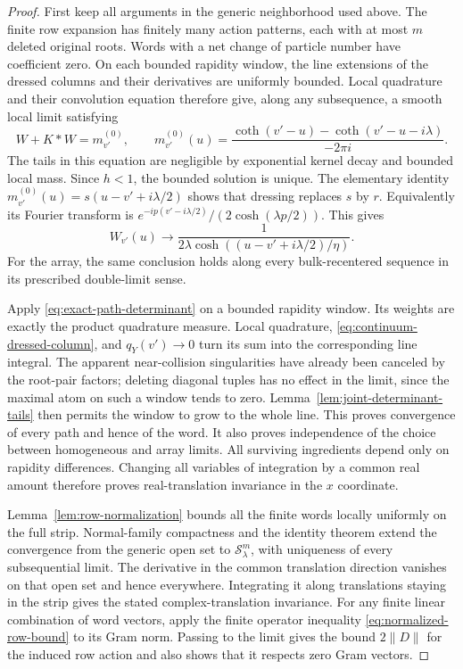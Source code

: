 \begin{proof}
First keep all arguments in the generic neighborhood used above.
The finite row expansion has finitely many action patterns, each
with at most $m$ deleted original roots.  Words with a net change
of particle number have coefficient zero.
On each bounded rapidity window, the line extensions of the
dressed columns and their derivatives are uniformly bounded.
Local quadrature and their convolution equation therefore give,
along any subsequence, a smooth local limit satisfying
\[
 W+K*W=m^{(0)}_{v'},
 \qquad
 m^{(0)}_{v'}(u)=
       \frac{\coth(v'-u)-\coth(v'-u-i\lambda)}{-2\pi i}.
\]
The tails in this equation are negligible by exponential kernel
decay and bounded local mass.  Since $h<1$, the bounded solution
is unique.  The elementary identity
$m^{(0)}_{v'}(u)=s(u-v'+i\lambda/2)$ shows that dressing
replaces $s$ by $r$.  Equivalently its Fourier transform is
$e^{-ip(v'-i\lambda/2)}/(2\cosh(\lambda p/2))$.
This gives
\begin{equation}\label{eq:continuum-dressed-column}
 W_{v'}(u)\longrightarrow
 \frac{1}{2\lambda
          \cosh((u-v'+i\lambda/2)/\eta)}.
\end{equation}
For the array, the same conclusion holds along every bulk-recentered
sequence in its prescribed double-limit sense.

Apply \eqref{eq:exact-path-determinant} on a bounded rapidity
window.  Its weights are exactly the product quadrature
measure.  Local quadrature, \eqref{eq:continuum-dressed-column},
and $q_Y(v')\to0$ turn its sum into the corresponding line
integral.  The apparent near-collision singularities have already
been canceled by the root-pair factors; deleting diagonal tuples
has no effect in the limit, since the maximal atom on such a
window tends to zero.  Lemma~\ref{lem:joint-determinant-tails}
then permits the window to grow to the whole line.
This proves convergence of every path and hence of the word.
It also proves independence of the choice between homogeneous
and array limits.  All surviving ingredients depend only on
rapidity differences.  Changing all variables of integration
by a common real amount therefore proves real-translation
invariance in the $x$ coordinate.

Lemma~\ref{lem:row-normalization} bounds all the finite words
locally uniformly on the full strip.  Normal-family compactness
and the identity theorem extend the convergence from the generic
open set to $\mathcal S_\lambda^m$, with uniqueness of every
subsequential limit.  The derivative in the common translation
direction vanishes on that open set and hence everywhere.
Integrating it along translations staying in the strip gives the
stated complex-translation invariance.
For any finite linear combination of word vectors, apply the
finite operator inequality \eqref{eq:normalized-row-bound} to
its Gram norm.  Passing to the limit gives the bound
$2\|D\|$ for the induced row action and also shows that it
respects zero Gram vectors.


\end{proof}
